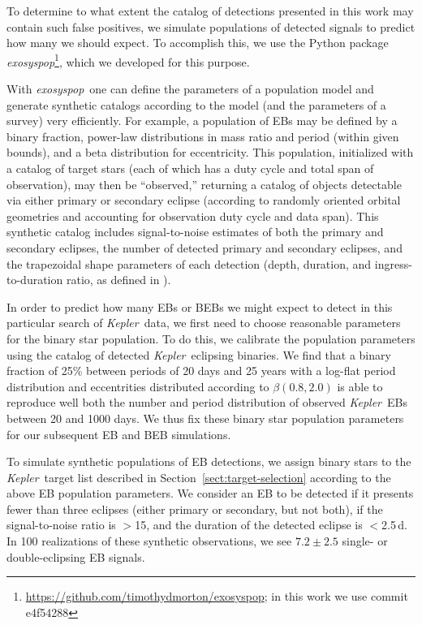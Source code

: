 \documentclass[manuscript, letterpaper]{aastex6}
\newcommand{\project}[1]{\textsl{#1}}
\newcommand{\kepler}{\project{Kepler}}
\newcommand{\exosyspop}{\project{exosyspop}}
\newcommand{\sectionname}{Section}
\newcommand{\sectref}[1]{\ref{sect:#1}}
\newcommand{\Sect}[1]{\sectionname~\sectref{#1}}
\newcommand{\sect}[1]{\Sect{#1}}
\begin{document}
To determine to what extent the catalog of detections presented in this work
may contain such false positives, we simulate populations of detected signals
to predict how many we should expect.  To accomplish this, we use the Python
package
\exosyspop\footnote{\url{https://github.com/timothydmorton/exosyspop}; in this
work we use commit \textsf{e4f54288}}, which
we developed for this purpose.

With \exosyspop\, one can define the parameters of a population model and
generate synthetic catalogs according to the model (and the parameters of a
survey) very efficiently.  For example, a population of EBs may be defined by
a binary fraction, power-law distributions in mass ratio and period (within
given bounds), and a beta distribution for eccentricity.  This population,
initialized with a catalog of target stars (each of which has a duty cycle and
total span of observation), may then be ``observed,'' returning a catalog of
objects detectable via either primary or secondary eclipse (according to
randomly oriented orbital geometries and accounting for observation duty cycle
and data span).  This synthetic catalog includes signal-to-noise estimates of
both the primary and secondary eclipses, the number of detected primary and
secondary eclipses, and the trapezoidal shape parameters of each detection
(depth, duration, and ingress-to-duration ratio, as defined in
\citealt{Morton:2012}).

In order to predict how many EBs or BEBs we might expect to detect in this
particular search of \kepler\ data, we first need to choose reasonable parameters
for the binary star population.  To do this, we calibrate the population
parameters using the catalog of detected \kepler\ eclipsing binaries.  We
find that a binary fraction of 25\% between periods of 20 days and 25 years with
a log-flat period distribution and eccentrities distributed according
to $\beta(0.8, 2.0)$ is able to reproduce well both the number and period
distribution of observed \kepler\ EBs between 20 and 1000 days.  We thus fix these
binary star population parameters for our subsequent EB and BEB simulations.

To simulate synthetic populations of EB detections, we assign binary stars  to
the \kepler\ target list described in \sect{target-selection} according to the
above EB population parameters.  We consider an EB to be detected if it
presents fewer than three eclipses (either primary or secondary, but not
both), if the signal-to-noise ratio is $>$15, and the duration of the
detected eclipse is $<$2.5\,d.  In 100 realizations of these synthetic
observations, we see $7.2 \pm 2.5$ single- or double-eclipsing EB signals.
\end{document}
